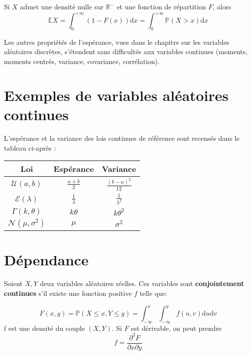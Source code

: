\documentclass[]{book}
\theoremstyle{definition}
\theoremstyle{definition}
\theoremstyle{definition}
\theoremstyle{remark}
\let\BeginKnitrBlock\begin \let\EndKnitrBlock\end
\begin{document}
\BeginKnitrBlock{lemma}
\protect\hypertarget{lem:unnamed-chunk-51}{}{\label{lem:unnamed-chunk-51} }Si \(X\) admet une densité nulle sur \(\mathbb{R}^-\) et une fonction de répartition \(F\), alors
\[\mathbb{E}X = \int_0^{+\infty} (1-F(x)) \mbox{d}x = \int_0^{+\infty} \mathbb{P}(X>x) \mbox{d}x\]
\EndKnitrBlock{lemma}

Les autres propriétés de l'espérance, vues dans le chapitre sur les variables aléatoires discrètes, s'étendent sans difficultés aux variables continues (moments, moments centrés, variance, covariance, corrélation).

\hypertarget{exemples-de-variables-aluxe9atoires-continues}{%
\section{Exemples de variables aléatoires continues}\label{exemples-de-variables-aluxe9atoires-continues}}

\BeginKnitrBlock{theorem}
\protect\hypertarget{thm:unnamed-chunk-52}{}{\label{thm:unnamed-chunk-52} }L'espérance et la variance des lois continues de référence sont recensés dans le tableau ci-après :

\begin{longtable}[]{@{}ccc@{}}
\toprule
Loi & Espérance & Variance\tabularnewline
\midrule
\endhead
\(\mathcal{U}(a,b)\) & \(\frac{a+b}{2}\) & \(\frac{(b-a)^2}{12}\)\tabularnewline
\(\mathcal{E}(\lambda)\) & \(\frac{1}{\lambda}\) & \(\frac{1}{\lambda^2}\)\tabularnewline
\(\Gamma(k,\theta)\) & \(k \theta\) & \(k \theta^2\)\tabularnewline
\(\mathcal{N}(\mu,\sigma^2)\) & \(\mu\) & \(\sigma^2\)\tabularnewline
\bottomrule
\end{longtable}
\EndKnitrBlock{theorem}

\hypertarget{duxe9pendance-1}{%
\section{Dépendance}\label{duxe9pendance-1}}

\BeginKnitrBlock{definition}
\protect\hypertarget{def:unnamed-chunk-53}{}{\label{def:unnamed-chunk-53} }Soient \(X,Y\) deux variables aléatoires réelles. Ces variables sont \textbf{conjointement continues} s'il existe une fonction positive \(f\) telle que:

\[F(x,y) = \mathbb{P}(X \leq x , Y \leq y) = \int_{-\infty}^x \int_{-\infty}^y f(u,v) \mbox{d}u \mbox{d}v\]
f est une densité du couple \((X,Y)\). Si \(F\) est dérivable, on peut prendre
\[f = \frac{\partial^2 F}{\partial x \partial y}\]
\EndKnitrBlock{definition}
\end{document}
